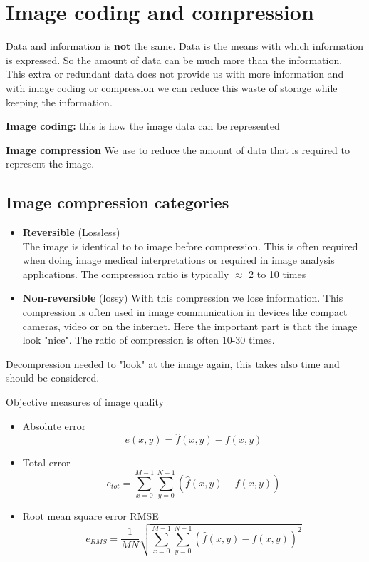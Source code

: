 \section{Image coding and compression}
Data and information is \textbf{not} the same. Data is the means with which information is expressed. So the amount of data can be much more than the information. This extra or redundant data does not provide us with more information and with image coding or compression we can reduce this waste of storage while keeping the information. 




\textbf{Image coding:} this is how the image data can be represented 

\textbf{Image compression} We use to reduce the amount of data that is required to represent the image. 

\subsection*{Image compression categories}
\begin{itemize}
	\item \textbf{Reversible} (Lossless) \\
	The image is identical to to image before compression. This is often required when doing image medical interpretations or required in image analysis applications. The compression ratio is typically $\approx$ 2 to 10 times
	\item \textbf{Non-reversible} (lossy) With this compression we lose information. This compression is often used in image communication in devices like compact cameras, video or on the internet. Here the important part is that the image look "nice". The ratio of compression is often 10-30 times.
\end{itemize}

\begin{wbox}{}
Decompression needed to "look" at the image again, this takes also time and should be considered. 
\end{wbox}


\begin{definition}{Objective measures of image quality}
\begin{itemize}
	\item Absolute error\\
	\begin{equation}
	e(x,y) = \hat{f}(x,y) - f(x,y)
	\end{equation}
	\item Total error \\
	\begin{equation}
	e_{tot} = \sum_{x=0}^{M-1} \sum_{y=0}^{N-1} (\hat{f}(x,y) - f(x,y))
	\end{equation}
	\item Root mean square error RMSE\\
	\begin{equation}
	e_{RMS} = \frac{1} {MN} \sqrt{\sum_{x=0}^{M-1} \sum_{y=0}^{N-1} (\hat{f}(x,y) - f(x,y))^{2}}
	\end{equation}
\end{itemize}
\end{definition}

